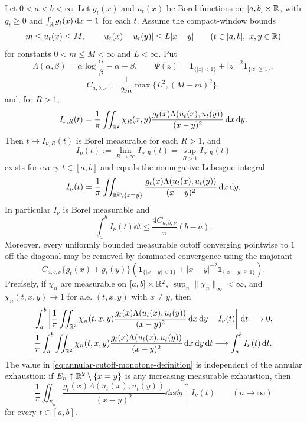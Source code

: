 \begin{lemma}%
\label{lem:annular-cutoff-measurable-bregman-dissipation}
Let \(0<a<b<\infty\).  Let \(g_t(x)\) and \(u_t(x)\) be Borel functions on
\([a,b]\times\mathbb{R}\), with \(g_t\ge0\) and
\(\int_{\mathbb{R}}g_t(x)\,\mathrm{d} x=1\) for each \(t\).  Assume the compact-window bounds
\[
m\le u_t(x)\le M,\qquad |u_t(x)-u_t(y)|\le L|x-y|
\qquad(t\in[a,b],\ x,y\in\mathbb{R})
\]
for constants \(0<m\le M<\infty\) and \(L<\infty\).  Put
\[
\Lambda(\alpha,\beta)=\alpha\log\frac{\alpha}{\beta}-\alpha+\beta,\qquad
\Psi(z)=\mathbf1_{\{|z|<1\}}+|z|^{-2}\mathbf1_{\{|z|\ge1\}},
\]
\[
C_{a,b,\nu}:=\frac{1}{2m}\max\{L^2,(M-m)^2\},
\]
and, for \(R>1\),
\[
I_{\nu,R}(t)=\frac1\pi\iint_{\mathbb{R}^2}\chi_R(x,y)
\frac{g_t(x)\Lambda(u_t(x),u_t(y))}{(x-y)^2}\,\mathrm{d} x\,\mathrm{d} y .
\]
Then \(t\mapsto I_{\nu,R}(t)\) is Borel measurable for each \(R>1\), and
\begin{equation}\label{eq:annular-cutoff-monotone-definition}
I_\nu(t):=\lim_{R\to\infty}I_{\nu,R}(t)
=\sup_{R>1}I_{\nu,R}(t)
\end{equation}
exists for every \(t\in[a,b]\) and equals the nonnegative Lebesgue integral
\begin{equation}\label{eq:annular-cutoff-full-integral}
I_\nu(t)=\frac1\pi\iint_{\mathbb{R}^2\setminus\{x=y\}}
\frac{g_t(x)\Lambda(u_t(x),u_t(y))}{(x-y)^2}\,\mathrm{d} x\,\mathrm{d} y .
\end{equation}
In particular \(I_\nu\) is Borel measurable and
\begin{equation}\label{eq:annular-cutoff-compact-window-bound}
\int_a^b I_\nu(t)\dd t\le \frac{4C_{a,b,\nu}}{\pi}(b-a).
\end{equation}
Moreover, every uniformly bounded measurable cutoff converging pointwise to
\(1\) off the diagonal may be removed by dominated convergence using the
majorant
\begin{equation}\label{eq:annular-cutoff-reusable-majorant}
C_{a,b,\nu}\{g_t(x)+g_t(y)\}
\left(\mathbf1_{\{|x-y|<1\}}+|x-y|^{-2}\mathbf1_{\{|x-y|\ge1\}}\right).
\end{equation}
Precisely, if \(\chi_n\) are measurable on \([a,b]\times\mathbb{R}^2\),
\(\sup_n\|\chi_n\|_\infty<\infty\), and
\(\chi_n(t,x,y)\to1\) for a.e. \((t,x,y)\) with \(x\ne y\), then
\begin{align}
&\int_a^b\left|
\frac1\pi\iint_{\mathbb{R}^2}\chi_n(t,x,y)
\frac{g_t(x)\Lambda(u_t(x),u_t(y))}{(x-y)^2}\,\mathrm{d} x\,\mathrm{d} y
-I_\nu(t)\right|\,\mathrm{d} t \longrightarrow0, \label{eq:bregman-cutoff-l1-time-removal}\\
&\frac1\pi\int_a^b\iint_{\mathbb{R}^2}\chi_n(t,x,y)
\frac{g_t(x)\Lambda(u_t(x),u_t(y))}{(x-y)^2}\,\mathrm{d} x\,\mathrm{d} y\,\mathrm{d} t
\longrightarrow
\int_a^b I_\nu(t)\,\mathrm{d} t . \label{eq:bregman-cutoff-integral-removal}
\end{align}
The value in \eqref{eq:annular-cutoff-monotone-definition} is independent of
the annular exhaustion: if \(E_n\uparrow\mathbb{R}^2\setminus\{x=y\}\) is any
increasing measurable exhaustion, then
\[
\frac1\pi\iint_{E_n}
\frac{g_t(x)\Lambda(u_t(x),u_t(y))}{(x-y)^2}\dd x\dd y
\uparrow I_\nu(t)
\qquad(n\to\infty)
\]
for every \(t\in[a,b]\).


\end{lemma}
